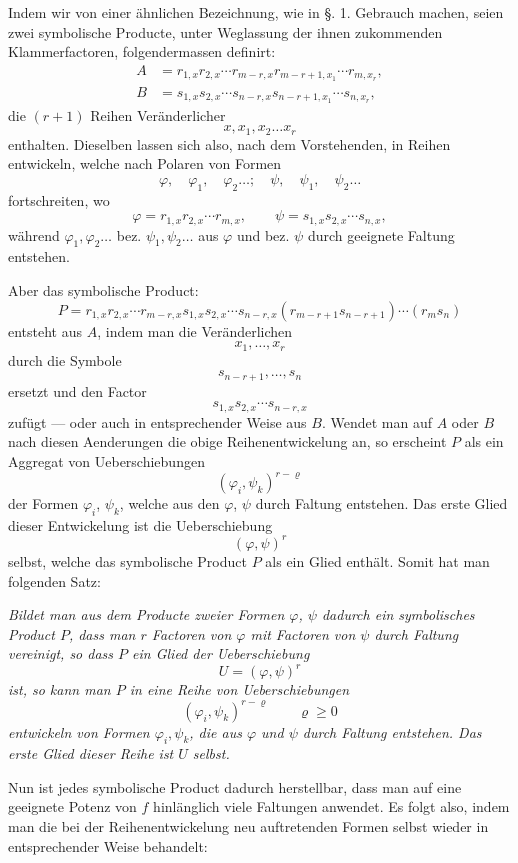 \documentclass[10pt]{article}
\begin{document}
Indem wir von einer ähnlichen Bezeichnung, wie in §. 1. Gebrauch machen, seien zwei symbolische Producte, unter Weglassung der ihnen zukommenden Klammerfactoren, folgendermassen definirt:
\[
\begin{aligned}
A&=r_{1,x}r_{2,x}\cdots r_{m-r,x}r_{m-r+1,x_1}\cdots r_{m,x_r},\\
B&=s_{1,x}s_{2,x}\cdots s_{n-r,x}s_{n-r+1,x_1}\cdots s_{n,x_r},
\end{aligned}
\]
die $(r+1)$ Reihen Veränderlicher
\[
x,x_1,x_2\ldots x_r
\]
enthalten. Dieselben lassen sich also, nach dem Vorstehenden, in Reihen entwickeln, welche nach Polaren von Formen
\[
\varphi,\quad \varphi_1,\quad \varphi_2\ldots;\quad \psi,\quad \psi_1,\quad \psi_2\ldots
\]
fortschreiten, wo
\[
\varphi=r_{1,x}r_{2,x}\cdots r_{m,x},\qquad
\psi=s_{1,x}s_{2,x}\cdots s_{n,x},
\]
während $\varphi_1,\varphi_2\ldots$ bez. $\psi_1,\psi_2\ldots$ aus $\varphi$ und bez. $\psi$ durch geeignete Faltung entstehen.

Aber das symbolische Product:
\[
P=r_{1,x}r_{2,x}\cdots r_{m-r,x}s_{1,x}s_{2,x}\cdots s_{n-r,x}(r_{m-r+1}s_{n-r+1})\cdots(r_ms_n)
\]
entsteht aus $A$, indem man die Veränderlichen
\[
x_1,\ldots,x_r
\]
durch die Symbole
\[
s_{n-r+1},\ldots,s_n
\]
ersetzt und den Factor
\[
s_{1,x}s_{2,x}\cdots s_{n-r,x}
\]
zufügt --- oder auch in entsprechender Weise aus $B$. Wendet man auf $A$ oder $B$ nach diesen Aenderungen die obige Reihenentwickelung an, so erscheint $P$ als ein Aggregat von Ueberschiebungen
\[
(\varphi_i,\psi_k)^{r-\varrho}
\]
der Formen $\varphi_i$, $\psi_k$, welche aus den $\varphi$, $\psi$ durch Faltung entstehen. Das erste Glied dieser Entwickelung ist die Ueberschiebung
\[
(\varphi,\psi)^r
\]
selbst, welche das symbolische Product $P$ als ein Glied enthält. Somit hat man folgenden Satz:

\emph{Bildet man aus dem Producte zweier Formen $\varphi$, $\psi$ dadurch ein symbolisches Product $P$, dass man $r$ Factoren von $\varphi$ mit Factoren von $\psi$ durch Faltung vereinigt, so dass $P$ ein Glied der Ueberschiebung}
\[
U=(\varphi,\psi)^r
\]
\emph{ist, so kann man $P$ in eine Reihe von Ueberschiebungen}
\[
(\varphi_i,\psi_k)^{r-\varrho}\qquad \varrho\geq0
\]
\emph{entwickeln von Formen $\varphi_i,\psi_k$, die aus $\varphi$ und $\psi$ durch Faltung entstehen. Das erste Glied dieser Reihe ist $U$ selbst.}

Nun ist jedes symbolische Product dadurch herstellbar, dass man auf eine geeignete Potenz von $f$ hinlänglich viele Faltungen anwendet. Es folgt also, indem man die bei der Reihenentwickelung neu auftretenden Formen selbst wieder in entsprechender Weise behandelt:
\end{document}
